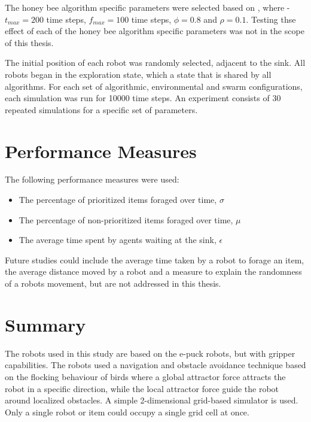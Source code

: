 The honey bee algorithm specific parameters were selected based on \cite{seeley2009wisdom}, where
-$t_{max}=200$ time steps, $f_{max}=100$ time steps, $\phi=0.8$ and $\rho=0.1$. Testing thse effect of each of the honey bee algorithm specific parameters was not in the scope of this thesis.

The initial position of each robot was randomly selected, adjacent to the sink. All robots began in the exploration state, which a state that is shared by all algorithms. For each set of algorithmic, environmental and swarm configurations, each simulation was run for 10000 time steps. An experiment consists of 30 repeated simulations for a specific set of parameters.

\section{Performance Measures}
\label{thri:third:performancemeasures}

The following performance measures were used: 

	\begin{itemize}
		\item	The percentage of prioritized items foraged over time,  $\sigma$ 
		\item	The percentage of non-prioritized items foraged over time, $\mu$
		\item   The average time spent by agents waiting at the sink, $\epsilon$
	\end{itemize}
	
Future studies could include the average time taken by a robot to forage an item, the average distance moved by a robot and a measure to explain the randomness of a robots movement, but are not addressed in this thesis. 




\section{Summary}
\label{third:summary}
The robots used in this study are based on the e-puck robots, but with gripper capabilities. The robots used a navigation and obstacle avoidance technique based on the flocking behaviour of birds where a global attractor force attracts the robot in a specific direction, while the local attractor force guide the robot around localized obstacles. A simple 2-dimensional grid-based simulator is used. Only a single robot or item could occupy a single grid cell at once.

